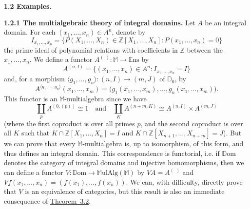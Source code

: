 \documentclass{article}
\newenvironment{rmenv}[1]
  {\phantomsection\par\medskip\noindent\textbf{#1.}\rmfamily}
  {\par\medskip}
\newcommand{\bb}[1]{{\mathbb{#1}}}
\newcommand{\Set}{\mathbb{E}\mathrm{ns}}
\newcommand{\MulAlg}{\mathbb{M}\mathrm{ulAlg}}
\newcommand{\Dom}{\mathbb{D}\mathrm{om}}
\newcommand{\oldpage}[1]{\marginpar{\footnotesize$\Big\vert$ \textit{p.~#1}}}
\begin{document}
\begin{rmenv}{1.2 Examples}
\begin{rmenv}{1.2.1 The multialgebraic theory of integral domains}
\oldpage{195}
    Let $A$ be an integral domain.
    For each $(x_1,\ldots,x_n)\in A^n$, denote by
    \[
      I_{x_1,\ldots,x_n} =
      \big\{
        P(X_1,\ldots,X_n)\in\bb{Z}[X_1,\ldots,X_n]
        :
        P(x_1,\ldots,x_n)=0
      \big\}
    \]
    the prime ideal of polynomial relations with coefficients in $\bb{Z}$ between the $x_1,\ldots,x_n$.
    We define a functor $A^{(\,\,)}\colon\bb{M}\to\Set$ by
    \[
      A^{(n,I)}=\{(x_1,\ldots,x_n)\in A^n:I_{x_1,\ldots,x_n}=I\}
    \]
    and, for a morphism $\langle g_1,\ldots,g_n\rangle\colon(n,I)\to(m,J)$ of $\bb{D}_0$, by
    \[
      A^{\langle g_1,\ldots,g_n\rangle}(x_1,\ldots,x_m) =
      \big(
        g_1(x_1,\ldots,x_m),
        \ldots,
        g_n(x_1,\ldots,x_m)
      \big).
    \]
    This functor is an $\bb{M}$-multialgebra since we have
    \[
      \coprod_p A^{(0,(p))} \cong 1
      \quad\text{and}\quad
      \coprod_K A^{(n+m,K)} \cong A^{(n,I)}\times A^{(m,J)}
    \]
    (where the first coproduct is over all primes $p$, and the second coproduct is over all $K$ such that $K\cap\bb{Z}[X_1,\ldots,X_n] = I$ and $K\cap\bb{Z}[X_{n+1},\ldots,X_{n+m}] = J$).
    But we can prove that every $\bb{M}$-multialgebra is, up to isomorphism, of this form, and thus defines an integral domain.
    This correspondence is functorial, i.e. if $\Dom$ denotes the category of integral domains and injective homomorphisms, then we can define a functor $V\colon\Dom\to\MulAlg(\bb{M})$ by $VA=A^{(\,\,)}$ and $Vf(x_1,\ldots,x_n)=(f(x_1),\ldots,f(x_n))$.
    We can, with difficulty, directly prove that $V$ is an equivalence of categories, but this result is also an immediate consequence of \hyperref[3.2]{Theorem~3.2}.
  \end{rmenv}


\end{rmenv}
\end{document}
